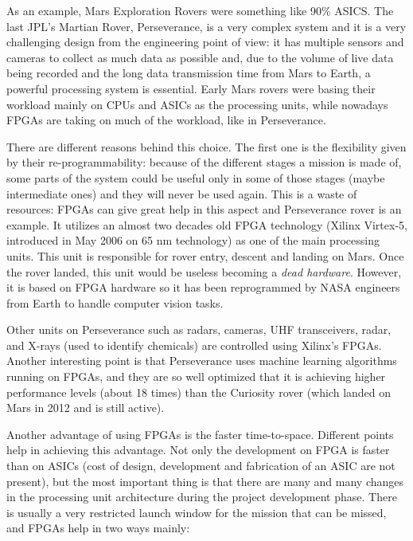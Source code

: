 As an example, Mars Exploration Rovers were something like 90\% ASICS. The last JPL's Martian Rover, Perseverance, is a very complex system and it is a very challenging design from the engineering point of view: it has multiple sensors and cameras to collect as much data as possible and, due to the volume of live data being recorded and the long data transmission time from Mars to Earth, a powerful processing system is essential. Early Mars rovers were basing their workload mainly on CPUs and ASICs as the processing units, while nowadays FPGAs are taking on much of the workload, like in Perseverance.\bigskip

There are different reasons behind this choice. The first one is the flexibility given by their re-programmability: because of the different stages a mission is made of, some parts of the system could be useful only in some of those stages (maybe intermediate ones) and they will never be used again. This is a waste of resources: FPGAs can give great help in this aspect and Perseverance rover is an example. It utilizes an almost two decades old FPGA technology (Xilinx Virtex-5, introduced in May 2006 on 65 nm technology) as one of the main processing units. This unit is responsible for rover entry, descent and landing on Mars. Once the rover landed, this unit would be useless becoming a \textit{dead hardware}. However, it is based on FPGA hardware so it has been reprogrammed by NASA engineers from Earth to handle computer vision tasks.\bigskip

Other units on Perseverance such as radars, cameras, UHF transceivers, radar, and X-rays (used to identify chemicals) are controlled using Xilinx's FPGAs. Another interesting point is that Perseverance uses machine learning algorithms running on FPGAs, and they are so well optimized that it is achieving higher performance levels (about 18 times) than the Curiosity rover (which landed on Mars in 2012 and is still active). \bigskip

Another advantage of using FPGAs is the faster time-to-space. Different points help in achieving this advantage. Not only the development on FPGA is faster than on ASICs (cost of design, development and fabrication of an ASIC are not present), but the most important thing is that there are many and many changes in the processing unit architecture during the project development phase. There is usually a very restricted launch window for the mission that can be missed, and FPGAs help in two ways mainly:

